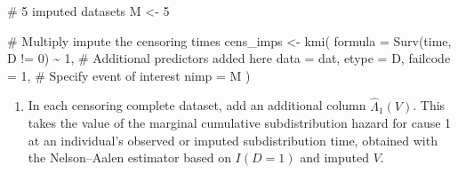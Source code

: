 \documentclass[
  12pt,
  a4paper,
]{article}
\newenvironment{Shaded}{\begin{snugshade}}{\end{snugshade}}
\newcommand{\AttributeTok}[1]{\textcolor[rgb]{0.40,0.45,0.13}{#1}}
\newcommand{\CommentTok}[1]{\textcolor[rgb]{0.37,0.37,0.37}{#1}}
\newcommand{\ControlFlowTok}[1]{\textcolor[rgb]{0.00,0.23,0.31}{\textbf{#1}}}
\newcommand{\DecValTok}[1]{\textcolor[rgb]{0.68,0.00,0.00}{#1}}
\newcommand{\FunctionTok}[1]{\textcolor[rgb]{0.28,0.35,0.67}{#1}}
\newcommand{\NormalTok}[1]{\textcolor[rgb]{0.00,0.23,0.31}{#1}}
\newcommand{\OtherTok}[1]{\textcolor[rgb]{0.00,0.23,0.31}{#1}}
\newcommand{\SpecialCharTok}[1]{\textcolor[rgb]{0.37,0.37,0.37}{#1}}
\newcommand{\StringTok}[1]{\textcolor[rgb]{0.13,0.47,0.30}{#1}}
\providecommand{\tightlist}{%
  \setlength{\itemsep}{0pt}\setlength{\parskip}{0pt}}\usepackage{longtable,booktabs,array}
\begin{document}
\begin{Shaded}
\begin{Highlighting}[]
\CommentTok{\# 5 imputed datasets}
\NormalTok{M }\OtherTok{\textless{}{-}} \DecValTok{5}

\CommentTok{\# Multiply impute the censoring times}
\NormalTok{cens\_imps }\OtherTok{\textless{}{-}} \FunctionTok{kmi}\NormalTok{(}
  \AttributeTok{formula =} \FunctionTok{Surv}\NormalTok{(time, D }\SpecialCharTok{!=} \DecValTok{0}\NormalTok{) }\SpecialCharTok{\textasciitilde{}} \DecValTok{1}\NormalTok{, }\CommentTok{\# Additional predictors added here}
  \AttributeTok{data =}\NormalTok{ dat,}
  \AttributeTok{etype =}\NormalTok{ D,}
  \AttributeTok{failcode =} \DecValTok{1}\NormalTok{, }\CommentTok{\# Specify event of interest}
  \AttributeTok{nimp =}\NormalTok{ M}
\NormalTok{)}
\end{Highlighting}
\end{Shaded}

\begin{enumerate}
\def\labelenumi{\arabic{enumi}.}
\setcounter{enumi}{2}
\tightlist
\item
  In each censoring complete dataset, add an additional column
  \(\hat{\Lambda}_1(V)\). This takes the value of the marginal
  cumulative subdistribution hazard for cause 1 at an individual's
  observed or imputed subdistribution time, obtained with the
  Nelson--Aalen estimator based on \(I(D = 1)\) and imputed \(V\).
\end{enumerate}

\begin{Shaded}
\end{Shaded}
\end{document}

